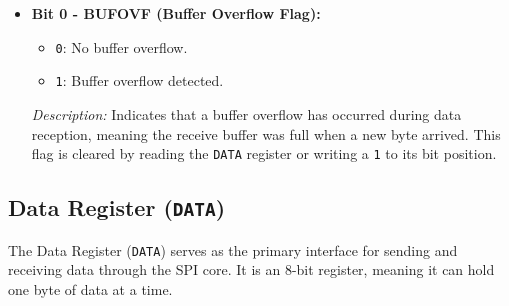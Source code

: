 \documentclass{article}
\begin{document}
\begin{itemize}
    \item \textbf{Bit 0 - BUFOVF (Buffer Overflow Flag):} 
    \begin{itemize}
        \item \texttt{0}: No buffer overflow.
        \item \texttt{1}: Buffer overflow detected.
    \end{itemize}
    \textit{Description:} Indicates that a buffer overflow has occurred during data reception, meaning the receive buffer was full when a new byte arrived. This flag is cleared by reading the \texttt{DATA} register or writing a \texttt{1} to its bit position.
\end{itemize}

\subsection{Data Register (\texttt{DATA})}
\label{sec:data_register}
The Data Register (\texttt{DATA}) serves as the primary interface for sending and receiving data through the SPI core. It is an 8-bit register, meaning it can hold one byte of data at a time.
\end{document}
